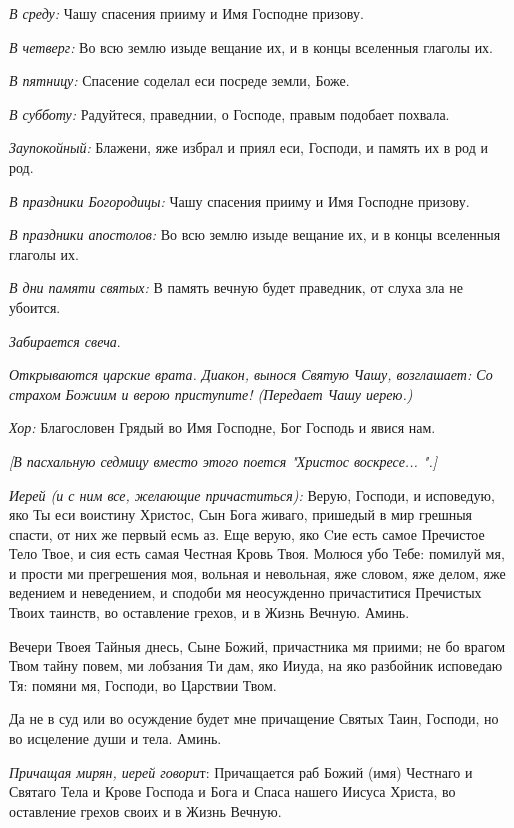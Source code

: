  {\itshape В среду:} Чашу спасения прииму и Имя Господне призову. 

 {\itshape В четверг:} Во всю землю изыде вещание их, и в концы вселенныя глаголы их. 

{\itshape    В пятницу:} Спасение соделал еси посреде земли, Боже. 

{\itshape    В субботу:} Радуйтеся, праведнии, о Господе, правым подобает похвала. 

{\itshape    Заупокойный:} Блажени, яже избрал и приял еси, Господи, и память их в род и род. 

{\itshape    В праздники Богородицы:} Чашу спасения прииму и Имя Господне призову. 

{\itshape    В праздники апостолов:} Во всю землю изыде вещание их, и в концы вселенныя глаголы их. 

 {\itshape В дни памяти святых:} В память вечную будет праведник, от слуха зла не убоится.  

{\itshape   Забирается свеча}. 

{\itshape  Открываются царские врата. Диакон, вынося Святую Чашу, возглашает: Со страхом Божиим и верою приступите!    (Передает Чашу иерею.) }

 {\itshape Хор:} Благословен Грядый во Имя Господне, Бог Господь и явися нам. 

{\itshape [В пасхальную седмицу вместо этого поется "Христос воскресе... ".]} 

{\itshape  Иерей (и с ним все, желающие причаститься):} Верую, Господи, и исповедую, яко Ты еси воистину Христос, Сын Бога живаго, пришедый в мир грешныя спасти, от них же первый есмь аз. Еще верую, яко Cие есть самое Пречистое Тело Твое, и сия есть самая Честная Кровь Твоя. Молюся убо Тебе: помилуй мя, и прости ми прегрешения моя, вольная и невольная, яже словом, яже делом, яже ведением и неведением, и сподоби мя неосужденно причаститися Пречистых Твоих таинств, во оставление грехов, и в Жизнь Вечную. Аминь.

   Вечери Твоея Тайныя днесь, Сыне Божий, причастника мя приими; не бо врагом Твом тайну повем, ми лобзания Ти дам, яко Ииуда, на яко разбойник исповедаю Тя: помяни мя, Господи, во Царствии Твом.

   Да не в суд или во осуждение будет мне причащение Святых Таин, Господи, но во исцеление души и тела. Аминь. 

\medskip 

 

 {\itshape  Причащая мирян, иерей говори}т: Причащается раб Божий (имя) Честнаго и Святаго Тела и Крове Господа и Бога и Спаса нашего Иисуса Христа, во оставление грехов своих и в Жизнь Вечную. 

